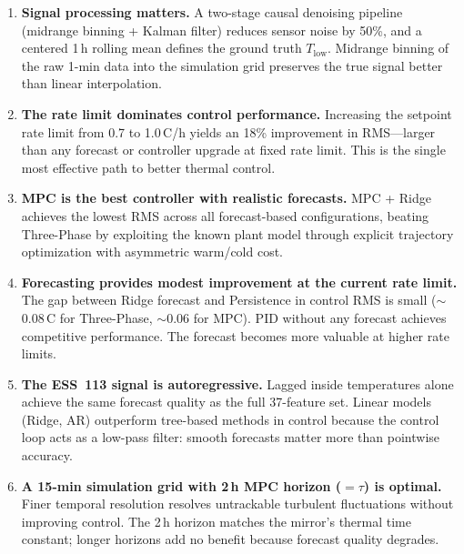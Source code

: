 \documentclass[11pt]{article}
\begin{document}
\begin{enumerate}
  \item \textbf{Signal processing matters.}  A two-stage causal denoising
    pipeline (midrange binning + Kalman filter) reduces sensor noise by 50\%,
    and a centered 1\,h rolling mean defines the ground truth $T_\mathrm{low}$.
    Midrange binning of the raw 1-min data into the simulation grid preserves
    the true signal better than linear interpolation.

  \item \textbf{The rate limit dominates control performance.}  Increasing the
    setpoint rate limit from 0.7 to 1.0\,\textdegree C/h yields an 18\%
    improvement in RMS---larger than any forecast or controller upgrade at
    fixed rate limit.  This is the single most effective path to better
    thermal control.

  \item \textbf{MPC is the best controller with realistic forecasts.}
    MPC + Ridge achieves the lowest RMS across all forecast-based
    configurations, beating Three-Phase by exploiting the known plant model
    through explicit trajectory optimization with asymmetric warm/cold cost.

  \item \textbf{Forecasting provides modest improvement at the current rate
    limit.}  The gap between Ridge forecast and Persistence in control RMS is
    small ($\sim$0.08\,\textdegree C for Three-Phase, $\sim$0.06 for MPC).
    PID without any forecast achieves competitive performance.  The forecast
    becomes more valuable at higher rate limits.

  \item \textbf{The ESS~113 signal is autoregressive.}  Lagged inside
    temperatures alone achieve the same forecast quality as the full 37-feature
    set.  Linear models (Ridge, AR) outperform tree-based methods in control
    because the control loop acts as a low-pass filter: smooth forecasts matter
    more than pointwise accuracy.

  \item \textbf{A 15-min simulation grid with 2\,h MPC horizon ($= \tau$) is
    optimal.}  Finer temporal resolution resolves untrackable turbulent
    fluctuations without improving control.  The 2\,h horizon matches the
    mirror's thermal time constant; longer horizons add no benefit because
    forecast quality degrades.
\end{enumerate}
\end{document}
